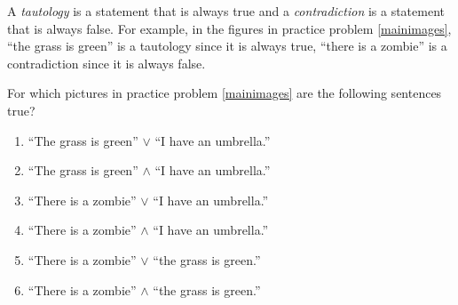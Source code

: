 \begin{defn}
    A \emph{tautology} is a statement that is always true and a \emph{contradiction} is a statement that is always false.  For example, in the figures in practice problem \ref{mainimages}, ``the grass is green'' is a tautology since it is always true, ``there is a zombie'' is a contradiction since it is always false.
\end{defn}

\begin{practiceprob}\label{pracprob:tautologies}
    For which pictures in practice problem \ref{mainimages} are the following sentences true?
    \begin{enumerate}
    \setlength{\itemsep}{10pt}
        \item ``The grass is green'' \(\vee\) ``I have an umbrella.'' 
        \item ``The grass is green'' \(\wedge\) ``I have an umbrella.'' 
        \item ``There is a zombie'' \(\vee\) ``I have an umbrella.'' 
        \item ``There is a zombie'' \(\wedge\) ``I have an umbrella.'' 
        \item ``There is a zombie'' \(\vee\) ``the grass is green.'' 
        \item ``There is a zombie'' \(\wedge\) ``the grass is green.'' 
    \end{enumerate}    
\end{practiceprob}

